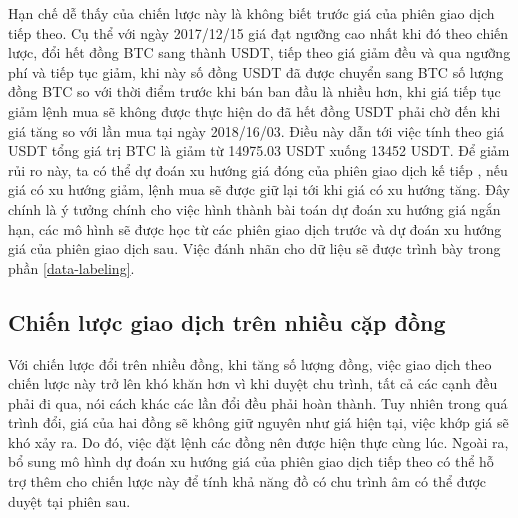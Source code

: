 Hạn chế dễ thấy của chiến lược này là không biết trước giá của phiên giao dịch tiếp theo. Cụ thể với ngày 2017/12/15 giá đạt ngưỡng cao nhất khi đó theo chiến lược, đổi hết đồng BTC sang thành USDT, tiếp theo giá giảm đều và qua ngưỡng phí và tiếp tục giảm, khi này số đồng USDT đã được chuyển sang BTC số lượng đồng BTC so với thời điểm trước khi bán ban đầu là nhiều hơn, khi giá tiếp tục giảm lệnh mua sẽ không được thực hiện do đã hết đồng USDT phải chờ đến khi giá tăng so với lần mua tại ngày 2018/16/03. Điều này dẫn tới việc tính theo giá USDT tổng giá trị BTC là giảm từ 14975.03 USDT xuống 13452 USDT. Để giảm rủi ro này, ta có thể dự đoán xu hướng giá đóng của phiên giao dịch kế tiếp
, nếu giá có xu hướng giảm, lệnh mua sẽ được giữ lại tới khi giá có xu hướng tăng. Đây chính là ý tưởng chính cho việc hình thành bài toán dự đoán xu hướng giá ngắn hạn, các mô hình sẽ được học từ các phiên giao dịch trước và dự đoán xu hướng giá của phiên giao dịch sau. Việc đánh nhãn cho dữ liệu sẽ được trình bày trong phần \ref{data-labeling}.
\subsection{Chiến lược giao dịch trên nhiều cặp đồng}
  Với chiến lược đổi trên nhiều đồng, khi tăng số lượng đồng, việc giao dịch theo chiến lược này trở lên khó khăn hơn vì khi duyệt chu trình, tất cả các cạnh đều phải đi qua, nói cách khác các lần đổi đều phải hoàn thành. Tuy nhiên trong quá trình đổi, giá của hai đồng sẽ không giữ nguyên như giá hiện tại, việc khớp giá sẽ khó xảy ra. Do đó, việc đặt lệnh các đồng nên được hiện thực cùng lúc. Ngoài ra, bổ sung mô hình dự đoán xu hướng giá của phiên giao dịch tiếp theo có thể hỗ trợ thêm cho chiến lược này để tính khả năng đồ có chu trình âm có thể được duyệt tại phiên sau.
  
  


